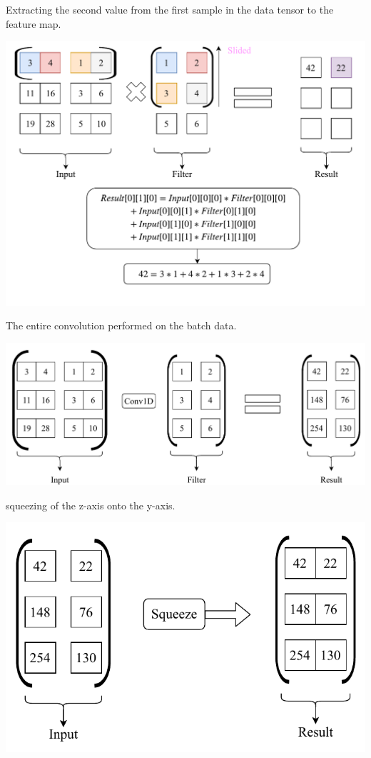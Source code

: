 \documentclass[12pt]{article}
\begin{document}
\begin{blockfigure}{Extracting the second value from the first sample in the data tensor to the feature map.}
	\begin{center}
		\includegraphics[width=\textwidth]{secondConvSample_step2}
	\end{center}
\end{blockfigure}
\newpage
\begin{blockfigure}{The entire convolution performed on the batch data.}
	\begin{center}
		\includegraphics[width=\textwidth]{secondConvSample_final}
	\end{center}
\end{blockfigure}
\begin{blockfigure}{squeezing of the z-axis onto the y-axis.}
	\begin{center}
		\includegraphics[width=\textwidth]{squeeze}
	\end{center}
\end{blockfigure}
\end{document}
